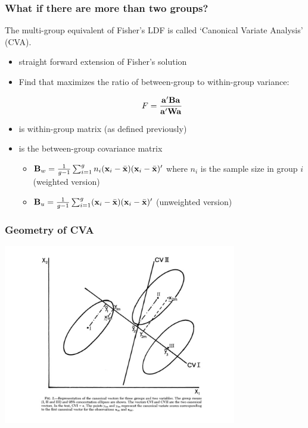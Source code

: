\documentclass{beamer}
\begin{document}
\begin{frame}
  \frametitle{What if there are more than two groups?}

The multi-group equivalent of Fisher's LDF is called `Canonical Variate Analysis' (CVA).

\begin{itemize}
\item straight forward extension of Fisher's solution
\item Find  that maximizes the ratio of between-group to within-group variance:

\[
F = \frac{\mathbf{a}'\mathbf{B}\mathbf{a}}{\mathbf{a}'\mathbf{W}\mathbf{a}}
\]

\item {} is within-group matrix (as defined previously)
\item {} is the between-group covariance matrix
\begin{itemize}
    \item $\mathbf{B}_w = \frac{1}{g-1}\sum_{i=1}^{g} n_i(\mathbf{x}_i - \bar{\mathbf{x}})(\mathbf{x}_i - \bar{\mathbf{x}})'$ where $n_i$ is the sample size in group $i$ (weighted version)
    \item  $\mathbf{B}_u = \frac{1}{g-1}\sum_{i=1}^{g} (\mathbf{x}_i - \bar{\mathbf{x}})(\mathbf{x}_i - \bar{\mathbf{x}})'$ (unweighted version)
\end{itemize}

\end{itemize}



\end{frame}

\begin{frame}
  \frametitle{Geometry of CVA}

\begin{center}
\includegraphics[height=3.1in]{3group}
\end{center}

\end{frame}
\end{document}
